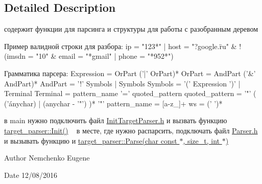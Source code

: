 \subsection{Detailed Description}
содержит функции для парсинга и структуры для работы с разобранным деревом 

\begin{DoxyVerb}Пример валидной строки для разбора:
  ip = "123*" | host = "?google.\"ru" & !(imsdn = "10" & email = "*gmail" | phone = "*952*")

Грамматика парсера:
  Expression     = OrPart ('|' OrPart)*
  OrPart         = AndPart ('&' AndPart)*
  AndPart        =  '!' Symbols | Symbols
  Symbols        = '('  Expression  ')' | Terminal
  Terminal       = pattern_name '=' quoted_pattern
  quoted_pattern = '"' ( ('\' anychar) | (anychar - '"') )* '"'
  pattern_name   = [a-z_]+
  ws             = (' ')*
\end{DoxyVerb}


в main нужно подключить файл \hyperlink{InitTargetParser_8h}{Init\+Target\+Parser.\+h} и вызвать функцию \hyperlink{namespacetarget__parser_aabf89c1d99b04bac59515c8616155d94}{target\+\_\+parser\+::\+Init()} ~\newline
 в месте, где нужно распарсить, подключать файл \hyperlink{Parser_8h}{Parser.\+h} и вызывать функцию и \hyperlink{namespacetarget__parser_a3e0ffa10d4fd38f05986d81c0529fdc1}{target\+\_\+parser\+::\+Parse(char const $\ast$, size\+\_\+t, int $\ast$)}

\begin{DoxyAuthor}{Author}
Nemchenko Eugene 
\end{DoxyAuthor}
\begin{DoxyDate}{Date}
12/08/2016 
\end{DoxyDate}
